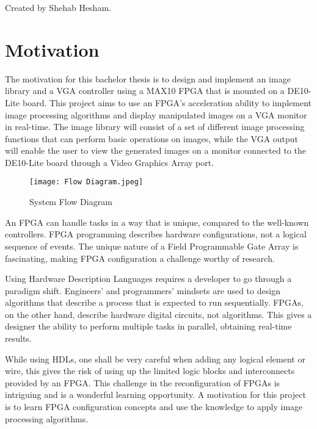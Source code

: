 	Created by Shehab Hesham.

\section{Motivation}

\par The motivation for this bachelor thesis is to design and implement an image library and a VGA controller using a MAX10 FPGA that is mounted on a DE10-Lite board. This project aims to use an FPGA's acceleration ability to implement image processing algorithms and display manipulated images on a VGA monitor in real-time. The image library will consist of a set of different image processing functions that can perform basic operations on images, while the VGA output will enable the user to view the generated images on a monitor connected to the DE10-Lite board through a Video Graphics Array port. \newline

\begin{figure}[H]
	\centering
	\texttt{[image: Flow Diagram.jpeg]}
	\caption{System Flow Diagram}
	\label{fig:FlowDiag}   
\end{figure}

\par An FPGA can handle tasks in a way that is unique, compared to the well-known controllers. FPGA programming describes hardware configurations, not a logical sequence of events. The unique nature of a Field Programmable Gate Array is fascinating, making FPGA configuration a challenge worthy of research.\newline

\par Using Hardware Description Languages requires a developer to go through a paradigm shift. Engineers' and programmers' mindsets are used to design algorithms that describe a process that is expected to run sequentially. FPGAs, on the other hand, describe hardware digital circuits, not algorithms. This gives a designer the ability to perform multiple tasks in parallel, obtaining real-time results. \newline

\par While using HDLs, one shall be very careful when adding any logical element or wire, this gives the risk of using up the limited logic blocks and interconnects provided by an FPGA. This challenge in the reconfiguration of FPGAs is intriguing and is a wonderful learning opportunity. A motivation for this project is to learn FPGA configuration concepts and use the knowledge to apply image processing algorithms.\newline

